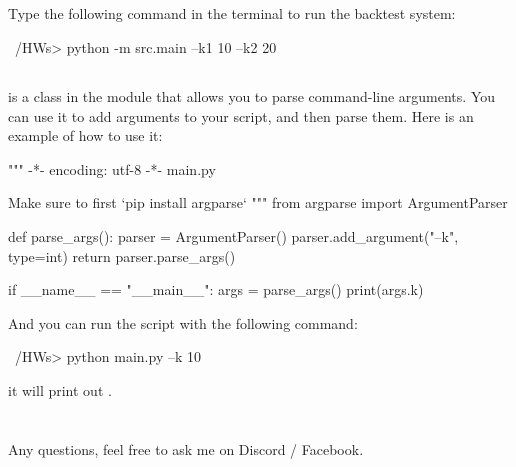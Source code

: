\documentclass[a4paper, 12pt]{article}
\begin{document}
\subsection*{}

Type the following command in the terminal to run the backtest system:

\begin{python}
~/HWs> python -m src.main --k1 10 --k2 20
\end{python}

\subsection*{}
 is a class in the  module
that allows you to parse command-line arguments. You can use it to add arguments
to your script, and then parse them. Here is an example of how to use it:

\begin{python}
"""
-*- encoding: utf-8 -*-
main.py

Make sure to first `pip install argparse`
"""
from argparse import ArgumentParser

def parse_args():
    parser = ArgumentParser()
    parser.add_argument("--k", type=int)
    return parser.parse_args()

if __name__ == "__main__":
    args = parse_args()
    print(args.k)
\end{python}

And you can run the script with the following command:

\begin{python}
~/HWs> python main.py --k 10
\end{python}

it will print out .

\section*{}


\noindent Any questions, feel free to ask me on Discord / Facebook. 
\end{document}
